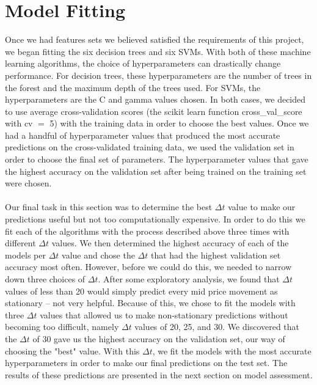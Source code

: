\documentclass[11pt]{article}
\begin{document}
\section{Model Fitting}
Once we had features sets we believed satisfied the requirements of this project, we began fitting the six decision trees and six SVMs. With both of these machine learning algorithms, the choice of hyperparameters can drastically change performance. For decision trees, these hyperparameters are the number of trees in the forest and the maximum depth of the trees used. For SVMs, the hyperparameters are the C and gamma values chosen. In both cases, we decided to use average cross-validation scores \big(the scikit learn function cross\_val\_score with cv $=$ 5\big) with the training data in order to choose the best values. Once we had a handful of hyperparameter values that produced the most accurate predictions on the cross-validated training data, we used the validation set in order to choose the final set of parameters. The hyperparameter values that gave the highest accuracy on the validation set after being trained on the training set were chosen.\\
\\
Our final task in this section was to determine the best $\Delta t$ value to make our predictions useful but not too computationally expensive. In order to do this we fit each of the algorithms with the process described above three times with different $\Delta t$ values. We then determined the highest accuracy of each of the models per $\Delta t$ value and chose the $\Delta t$ that had the highest validation set accuracy most often. However, before we could do this, we needed to narrow down three choices of $\Delta t$. After some exploratory analysis, we found that $\Delta t$ values of less than 20 would simply predict every mid price movement as stationary -- not very helpful. Because of this, we chose to fit the models with three $\Delta t$ values that allowed us to make non-stationary predictions without becoming too difficult, namely $\Delta t$ values of 20, 25, and 30. We discovered that the $\Delta t$ of 30 gave us the highest accuracy on the validation set, our way of choosing the "best" value. With this $\Delta t$, we fit the models with the most accurate hyperparameters in order to make our final predictions on the test set. The results of these predictions are presented in the next section on model assessment.
\end{document}
